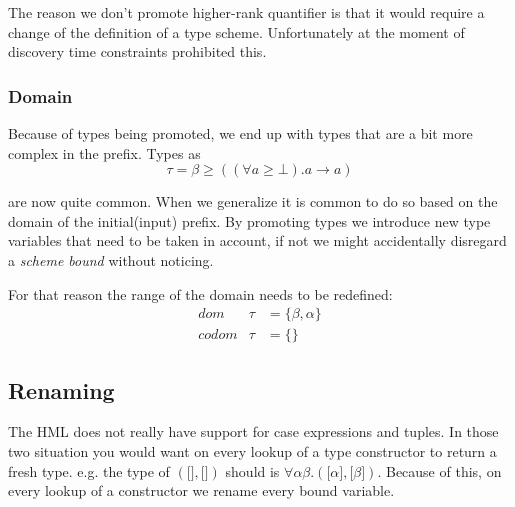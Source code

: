 The reason we don't promote higher-rank quantifier is that it would require a change of the definition of a type scheme. Unfortunately at the moment of discovery time constraints prohibited this.
\subsubsection{Domain}
Because of types being promoted, we end up with types that are a bit more complex in the prefix. Types as 
\begin{equation}
\tau = \beta \geq ((\forall a \geq \bot). a \rightarrow a)
\end{equation}

are now quite common. When we generalize it is common to do so based on the domain of the initial(input) prefix. By promoting types we introduce new type variables that need to be taken in account, if not we might accidentally disregard a \emph{scheme bound} without noticing.

For that reason the range of the domain needs to be redefined:
\begin{eqnarray*}
dom   &\tau& = \{\beta, \alpha\}\\
codom &\tau& = \{\}
\end{eqnarray*}
\subsection{Renaming}
\label{renaming}
The HML does not really have support for case expressions and tuples. In those two situation you would want on every lookup of a type constructor to return a fresh type. e.g. the type of $(\lbrack \rbrack, \lbrack \rbrack)$ should is $\forall \alpha \beta . (\lbrack \alpha \rbrack, \lbrack \beta \rbrack)$. Because of this, on every lookup of a constructor we rename every bound variable.
